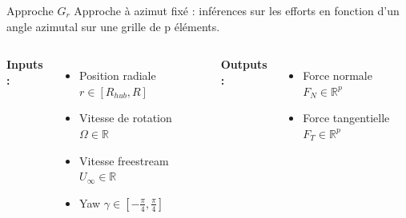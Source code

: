 \documentclass[
11pt,notheorems,hyperref={pdfauthor=whatever}
]{beamer}
\begin{document}
\begin{frame}{Approche $G_r$}
    Approche à azimut fixé : inférences sur les efforts en fonction d’un angle azimutal sur une grille de p
    éléments.

    \vspace{0.3cm}

    \begin{columns}[c]
        \textbf{Inputs :}
        \begin{itemize}\small
            \item Position radiale $r \in \left[R_{hub}, R\right]$
            \item Vitesse de rotation $\Omega \in \mathbb{R}$
            \item Vitesse freestream $U_{\infty} \in \mathbb{R}$
            \item Yaw $\gamma \in \left[-\frac{\pi}{4}, \frac{\pi}{4}\right]$
        \end{itemize}

        \centering

        \textbf{Outputs :}
        \begin{itemize}\small
            \item Force normale $F_N \in \mathbb{R}^p$
            \item Force tangentielle $F_T \in \mathbb{R}^p$
        \end{itemize}
    \end{columns}
\end{frame}
\end{document}

